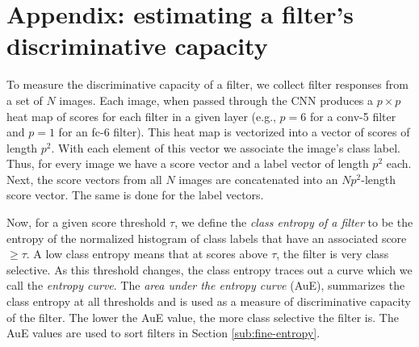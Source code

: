 \section*{Appendix: estimating a filter's discriminative capacity}
\label{sub:app-entropy}
To measure the discriminative capacity of a filter, we collect filter responses from a set of $N$ images.
Each image, when passed through the CNN produces a $p \times p$ heat map of scores for each filter in a given layer (e.g., $p = 6$ for a conv-5 filter and $p = 1$ for an fc-6 filter).
This heat map is vectorized into a vector of scores of length $p^2$. With each element of this vector we associate the image's class label. 
Thus, for every image we have a score vector and a label vector of length $p^2$ each.
Next, the score vectors from all $N$ images are concatenated into an $Np^2$-length score vector.
The same is done for the label vectors.

Now, for a given score threshold $\tau$, we define the \emph{class entropy of a filter} to be the entropy of the normalized histogram of class labels that have an associated score $\geq \tau$.
A low class entropy means that at scores above $\tau$, the filter is very class selective.
As this threshold changes, the class entropy traces out a curve which we call the \emph{entropy curve}.
The \emph{area under the entropy curve} (AuE), summarizes the class entropy at all thresholds and is used as a measure of discriminative capacity of the filter. 
The lower the AuE value, the more class selective the filter is.
The AuE values are used to sort filters in Section \ref{sub:fine-entropy}.



